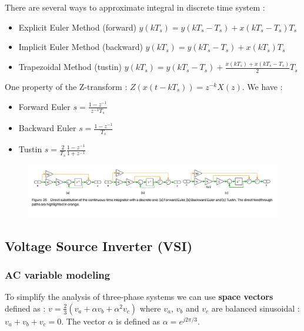 \documentclass[../main.tex]{subfiles}
\begin{document}
There are several ways to approximate integral in discrete time system : \begin{itemize}
    \item Explicit Euler Method (forward) $y(kT_s) = y(kT_s - T_s) + x(kT_s - T_s) T_s$
    \item Implicit Euler Method (backward) $y(kT_s) = y(kT_s - T_s) + x(kT_s) T_s$
    \item Trapezoidal Method (tustin) $y(kT_s) = y(kT_s - T_s) + \frac{x(kT_s) + x(kT_s - T_s)}{2} T_s$
\end{itemize}

One property of the Z-transform : $Z(x(t- kT_s)) = z^{-k} X(z)$. 
We have : \begin{itemize}
    \item Forward Euler $s = \frac{1-z^{-1}}{z^{-1} T_s}$
    \item Backward Euler $s = \frac{1-z^{-1}}{T_s}$
    \item Tustin $s = \frac{2}{T_s} \frac{1-z^{-1}}{1+z^{-1}}$
\end{itemize}

\begin{figure}[hbt!]
    \centering
    \includegraphics[width=0.9\linewidth]{IMAGES/Indus_el/IMG_0180.jpeg}
\end{figure}

\subsection{Voltage Source Inverter (VSI)}
\subsubsection{AC variable modeling}

To simplify the analysis of three-phase systems we can use \textbf{space vectors} defined as : $v = \frac{2}{3} (v_a + \alpha v_b + \alpha^2 v_c)$ where $v_a$, $v_b$ and $v_c$ are balanced sinusoidal : $v_a + v_b + v_c = 0$. The vector $\alpha$ is defined as $\alpha = e^{j 2\pi/3}$.\\
\end{document}
